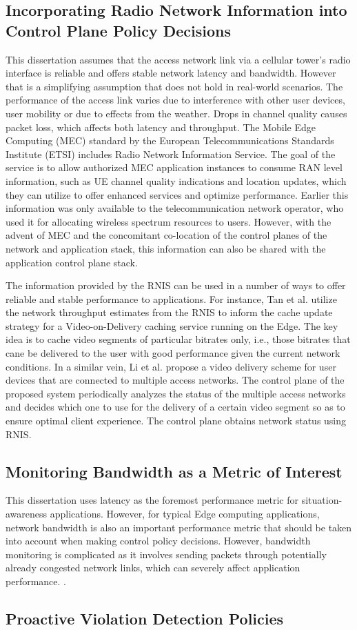 \subsection{Incorporating Radio Network Information into Control Plane Policy Decisions}
This dissertation assumes that the access network link via a cellular tower's radio interface is reliable and offers stable network latency and bandwidth. However that is a simplifying assumption that does not hold in real-world scenarios. The performance of the access link varies due to interference with other user devices, user mobility or due to effects from the weather. Drops in channel quality causes packet loss, which affects both latency and throughput. The Mobile Edge Computing (MEC) standard by the European Telecommunications Standards Institute (ETSI) includes Radio Network Information Service. The goal of the service is to allow authorized MEC application instances to consume RAN level information, such as UE channel quality indications and location updates, which they can utilize to offer enhanced services and optimize performance. Earlier this information was only available to the telecommunication network operator, who used it for allocating wireless spectrum resources to users. However, with the advent of MEC and the concomitant co-location of the control planes of the network and application stack, this information can also be shared with the application control plane stack.
\par The information provided by the RNIS can be used in a number of ways to offer reliable and stable performance to applications. For instance, Tan et al. \cite{tan2018radio} utilize the network throughput estimates from the RNIS to inform the cache update strategy for a Video-on-Delivery caching service running on the Edge. The key idea is to cache video segments of particular bitrates only, i.e., those bitrates that cane be delivered to the user with good performance given the current network conditions. In a similar vein, Li et al. \cite{li2017mobile} propose a video delivery scheme for user devices that are connected to multiple access networks. The control plane of the proposed system periodically analyzes the status of the multiple access networks and decides which one to use for the delivery of a certain video segment so as to ensure optimal client experience. The control plane obtains network status using RNIS. 

\subsection{Monitoring Bandwidth as a Metric of Interest}
This dissertation uses latency as the foremost performance metric for situation-awareness applications. However, for typical Edge computing applications, network bandwidth is also an important performance metric that should be taken into account when making control policy decisions. However, bandwidth monitoring is complicated as it involves sending packets through potentially already congested network links, which can severely affect application performance. .

\subsection{Proactive Violation Detection Policies}